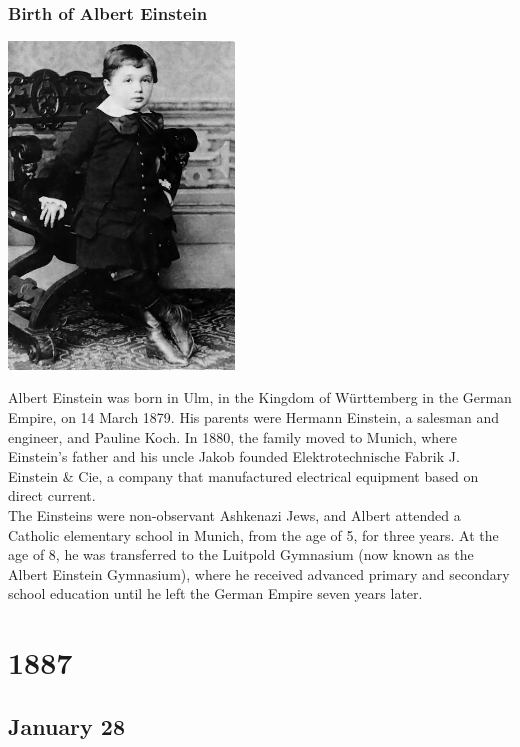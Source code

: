 \documentclass[11pt]{report}
\begin{document}
\subsection{Birth of Albert Einstein}
\vspace{2mm}\begin{center}\includegraphics[width=6cm]{./img/youngEinstein.jpg}\end{center}
Albert Einstein was born in Ulm, in the Kingdom of Württemberg in the German Empire, on 14 March 1879. His parents were Hermann Einstein, a salesman and engineer, and Pauline Koch. In 1880, the family moved to Munich, where Einstein's father and his uncle Jakob founded Elektrotechnische Fabrik J. Einstein \& Cie, a company that manufactured electrical equipment based on direct current.\\
The Einsteins were non-observant Ashkenazi Jews, and Albert attended a Catholic elementary school in Munich, from the age of 5, for three years. At the age of 8, he was transferred to the Luitpold Gymnasium (now known as the Albert Einstein Gymnasium), where he received advanced primary and secondary school education until he left the German Empire seven years later.

\chapter{1887}
\section{January 28}
\end{document}
